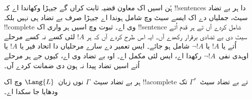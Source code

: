 \documentclass[../../../include/open-logic-section]{subfiles}
\begin{document}
      {}
      {}


\begin{explain}
ہُن اسیں اک معاون قضیہ ثابت کراں گے جیہڑا وکھاندا اے کہ
!!{sentence}s دا ہر بے تضاد سیٹ، جملیاں دے اک ایسے
سیٹ وچ شامل ہوندا اے جیہڑا صرف بے تضاد ہی نہیں بلکہ
!!{complete} وی اے۔ ثبوت وچ اسیں ہر واری اک
!!{sentence} شامل کردے آں تے ہر قدم اُتے سیٹ دی
بے تضادی برقرار رکھدے آں۔ ایہ اس طرح کردے آں کہ
ہر $!A$ لئی کسے نہ کسے مرحلے اُتے یا $!A$ یا
$\lnot !A$ شامل ہو جائے۔ ایس تعمیر دے سارے
مرحلیاں دا اتحاد فیر یا $!A$ یا اوہدی نفی~$\lnot !A$
رکھدا اے، ایس لئی مکمل اے۔ اوہ بے تضاد وی اے،
کیوں جے ہر مرحلے اُتے اسیں تضاد پیدا نہ ہون دی
ضمانت کردے آں۔
\end{explain}

\begin{lem}
 ہر بے تضاد سیٹ~$\Gamma$
نوں زبان~$\Lang{L}$ وچ اک !!a{complete} تے بے تضاد
سیٹ~$\Gamma^*$ تک ودھایا جا سکدا اے۔
\end{lem}
\end{document}
